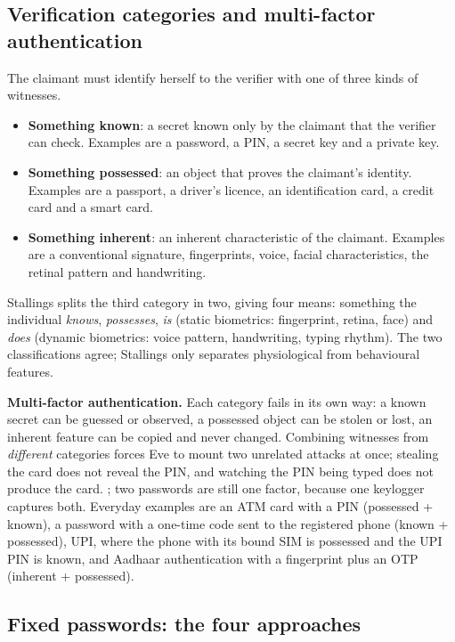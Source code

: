 \subsection{Verification categories and multi-factor authentication \new}

The claimant must identify herself to the verifier with one of three kinds of witnesses.
\begin{itemize}
  \item \textbf{Something known}: a secret known only by the claimant that the verifier can check. Examples are a password, a PIN, a secret key and a private key.
  \item \textbf{Something possessed}: an object that proves the claimant's identity. Examples are a passport, a driver's licence, an identification card, a credit card and a smart card.
  \item \textbf{Something inherent}: an inherent characteristic of the claimant. Examples are a conventional signature, fingerprints, voice, facial characteristics, the retinal pattern and handwriting.
\end{itemize}
Stallings splits the third category in two, giving four means: something the individual \emph{knows}, \emph{possesses}, \emph{is} (static biometrics: fingerprint, retina, face) and \emph{does} (dynamic biometrics: voice pattern, handwriting, typing rhythm). The two classifications agree; Stallings only separates physiological from behavioural features.

\textbf{Multi-factor authentication.} Each category fails in its own way: a known secret can be guessed or observed, a possessed object can be stolen or lost, an inherent feature can be copied and never changed. Combining witnesses from \emph{different} categories forces Eve to mount two unrelated attacks at once; stealing the card does not reveal the PIN, and watching the PIN being typed does not produce the card. ; two passwords are still one factor, because one keylogger captures both. Everyday examples are an ATM card with a PIN (possessed + known), a password with a one-time code sent to the registered phone (known + possessed), UPI, where the phone with its bound SIM is possessed and the UPI PIN is known, and Aadhaar authentication with a fingerprint plus an OTP (inherent + possessed).

\subsection{Fixed passwords: the four approaches \new}


